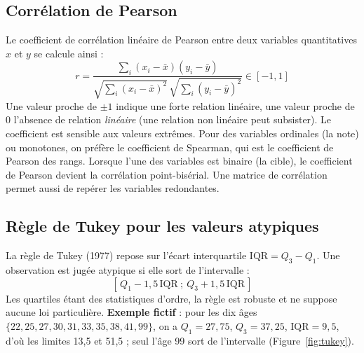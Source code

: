 \documentclass[11pt,a4paper]{report}
\numberwithin{equation}{chapter}
\begin{document}
\subsection{Corrélation de Pearson}\label{sec:pearson}
Le coefficient de corrélation linéaire de Pearson entre deux variables quantitatives $x$ et $y$ se calcule ainsi :
\begin{equation}\label{eq:pearson}
r = \frac{\sum_i (x_i-\bar{x})(y_i-\bar{y})}{\sqrt{\sum_i (x_i-\bar{x})^2}\,\sqrt{\sum_i (y_i-\bar{y})^2}} \in [-1,1]
\end{equation}
Une valeur proche de $\pm 1$ indique une forte relation linéaire, une valeur proche de 0 l'absence de relation \textit{linéaire} (une relation non linéaire peut subsister). Le coefficient est sensible aux valeurs extrêmes. Pour des variables ordinales (la note) ou monotones, on préfère le coefficient de Spearman, qui est le coefficient de Pearson des rangs. Lorsque l'une des variables est binaire (la cible), le coefficient de Pearson devient la corrélation point-bisérial. Une matrice de corrélation permet aussi de repérer les variables redondantes.

\subsection{Règle de Tukey pour les valeurs atypiques}\label{sec:tukey}
La règle de Tukey (1977) repose sur l'écart interquartile $\mathrm{IQR} = Q_3 - Q_1$. Une observation est jugée atypique si elle sort de l'intervalle :
\begin{equation}\label{eq:tukey}
[\,Q_1 - 1{,}5\,\mathrm{IQR}\ ;\ Q_3 + 1{,}5\,\mathrm{IQR}\,]
\end{equation}
Les quartiles étant des statistiques d'ordre, la règle est robuste et ne suppose aucune loi particulière. \textbf{Exemple fictif} : pour les dix âges $\{22, 25, 27, 30, 31, 33, 35, 38, 41, 99\}$, on a $Q_1 = 27{,}75$, $Q_3 = 37{,}25$, $\mathrm{IQR} = 9{,}5$, d'où les limites 13,5 et 51,5 ; seul l'âge 99 sort de l'intervalle (Figure~\ref{fig:tukey}).
\end{document}

